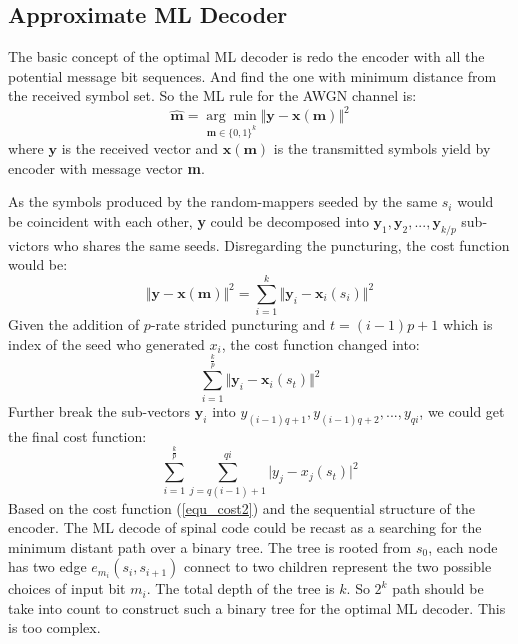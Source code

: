\documentclass[conference]{IEEEtran}
\begin{document}
\subsection{Approximate ML Decoder}
The basic concept of the optimal ML decoder is 	redo the encoder with all the potential message bit sequences. And find the one with minimum distance from the received symbol set. So the ML rule for the AWGN channel is:
\begin{equation}
\widehat{\textbf{m}}=\underset{\textbf{m}\in\{0,1\}^k}{\arg\min}\Vert\textbf{y}-\textbf{x}(\textbf{m})\Vert^2
\label{equ_ml}
\end{equation}
where $\textbf{y}$ is the received vector and $\textbf{x}(\textbf{m})$ is the transmitted symbols yield by encoder with message vector \textbf{m}.

As the  symbols produced by the random-mappers seeded by the same $s_i$ would be coincident with each other, \textbf{y} could be decomposed into $\textbf{y}_1,\textbf{y}_2,...,\textbf{y}_{k/p}$ sub-victors who shares the same seeds. Disregarding the puncturing, the cost function would be:
\begin{equation}
\Vert\textbf{y}-\textbf{x}(\textbf{m})\Vert^2=\sum_{i=1}^{k}\Vert\textbf{y}_{i}-\textbf{x}_{i}(s_{i})\Vert^2
\label{equ_cost0}
\end{equation}
Given the addition of $p$-rate strided puncturing and $t =(i-1)p+1$ which is index of the seed who generated $x_i$, the cost function changed into:
\begin{equation}
\sum_{i=1}^{\frac{k}{p}}\Vert\textbf{y}_{i}-\textbf{x}_{i}(s_{t})\Vert^2
\label{equ_cost1}
\end{equation}
Further break the sub-vectors $\textbf{y}_i$ into $y_{(i-1)q+1},y_{(i-1)q+2},...,y_{qi}$, we could get the final  cost function:%
\begin{equation}
\sum_{i=1}^{\frac{k}{p}}\sum_{j=q(i-1)+1}^{qi}\vert y_{j}-x_{j}(s_{t})\vert^2
\label{equ_cost2}
\end{equation}
Based on the cost function (\ref{equ_cost2}) and the sequential structure of the encoder. The ML decode of spinal code could be recast as a searching for the minimum distant path over a binary tree. The tree is rooted from $s_0$, each node has two edge $e_{m_i}(s_i,s_{i+1})$ connect to two children represent the two possible choices of input bit $m_i$. The total depth of the tree is $k$. So $2^k$ path should be take into count to construct such a binary tree for the optimal ML decoder. This is too complex. 
\end{document}
